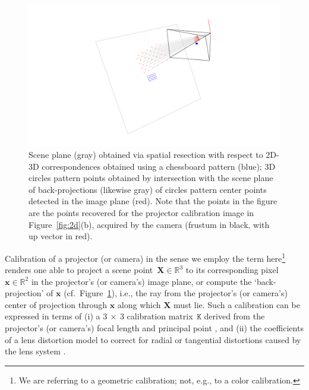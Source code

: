 \documentclass[review]{elsarticle}
\begin{document}
\begin{figure}
		\centerline{\includegraphics[scale=.35]{images/2d3d.png}}
		\caption{Scene plane (gray) obtained via spatial resection with respect to 2D-3D correspondences obtained using a chessboard pattern (blue); 3D circles pattern points obtained by intersection with the scene plane of back-projections (likewise gray) of circles pattern center points detected in the image plane (red). Note that the points in the figure are the points recovered for the projector calibration image in Figure~\ref{fig:2d}(b), acquired by the camera (frustum in black, with up vector in red).}
    \label{fig:3d}
\end{figure}


Calibration of a projector (or camera) in the sense we employ the term here\footnote{We are referring to a geometric calibration; not, e.g., to a color calibration.} renders one able to project a scene point~$\mathbf{X} \in \mathbb{R}^3$ to its corresponding pixel~$\mathbf{x} \in \mathbb{R}^2$ in the projector's (or camera's) image plane, or compute the `back-projection' of $\mathbf{x}$ (cf.\ Figure~\ref{fig:3d}), i.e., the ray from the projector's (or camera's) center of projection through $\mathbf{x}$ along which $\mathbf{X}$ must lie. Such a calibration can be expressed in terms of (i) a $3~\times{}~3$ calibration matrix~$\mathtt{K}$ derived from the projector's (or camera's) focal length and principal point \cite{Hartley2004}, and (ii) the coefficients of a lens distortion model to correct for radial or tangential distortions caused by the lens system \cite{duane1971close}.
\end{document}

